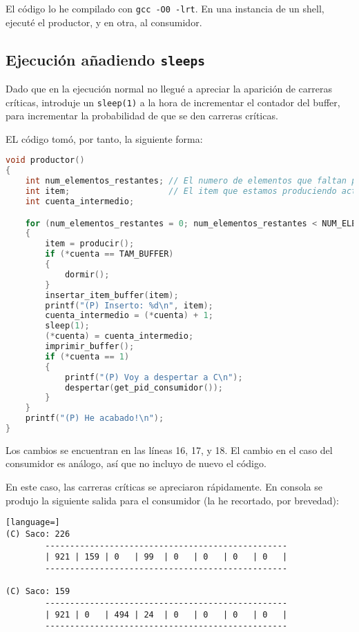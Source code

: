 \documentclass[a4paper]{article}
\begin{document}
El código lo he compilado con \texttt{gcc -O0 -lrt}. En una instancia de un shell, ejecuté el productor, y en otra, al consumidor.

\subsection{Ejecución añadiendo \texttt{sleeps}}

Dado que en la ejecución normal no llegué a apreciar la aparición de carreras críticas, introduje un \texttt{sleep(1)} a la hora de incrementar el contador del buffer, para incrementar la probabilidad de que se den carreras críticas.

EL código tomó, por tanto, la siguiente forma:

\begin{lstlisting}[language=C]
void productor()
{
    int num_elementos_restantes; // El numero de elementos que faltan por producir
    int item;                    // El item que estamos produciendo actualmente
    int cuenta_intermedio;

    for (num_elementos_restantes = 0; num_elementos_restantes < NUM_ELEMENTOS_TOTALES; num_elementos_restantes++)
    {
        item = producir();
        if (*cuenta == TAM_BUFFER)
        {
            dormir();
        }
        insertar_item_buffer(item);
        printf("(P) Inserto: %d\n", item);
        cuenta_intermedio = (*cuenta) + 1;
        sleep(1);
        (*cuenta) = cuenta_intermedio;
        imprimir_buffer();
        if (*cuenta == 1)
        {
            printf("(P) Voy a despertar a C\n");
            despertar(get_pid_consumidor());
        }
    }
    printf("(P) He acabado!\n");
}
\end{lstlisting}

Los cambios se encuentran en las líneas 16, 17, y 18. El cambio en el caso del consumidor es análogo, así que no incluyo de nuevo el código.

En este caso, las carreras críticas se apreciaron rápidamente. En consola se produjo la siguiente salida para el consumidor (la he recortado, por brevedad):

\begin{lstlisting}[language=]
(C) Saco: 226
        -------------------------------------------------
        | 921 | 159 | 0   | 99  | 0   | 0   | 0   | 0   |
        -------------------------------------------------
        
(C) Saco: 159
        -------------------------------------------------
        | 921 | 0   | 494 | 24  | 0   | 0   | 0   | 0   |
        -------------------------------------------------
\end{lstlisting}
\end{document}
